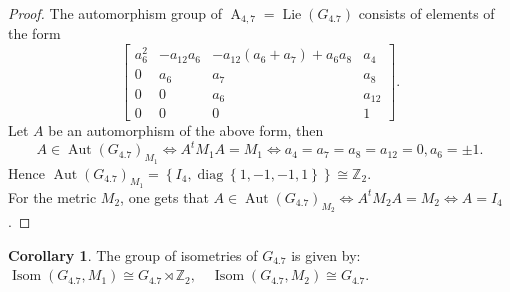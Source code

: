 \documentclass[12pt,a4paper,twoside]{article}
\theoremstyle{definition}
\newtheorem{corollary}[theorem]{Corollary}
\begin{document}
\begin{proof}
The automorphism group of $\operatorname{A}_{4, 7} = \operatorname{Lie}(G_{4.7})$ consists of elements of the form \cite{christodoulakis2003automorphisms}
$$\begin{bmatrix}
a_6^2 & -a_{12}a_6 & -a_{12}(a_6 + a_7) + a_6a_8 & a_4\\
0 & a_6 & a_7 & a_8\\
0 & 0 & a_6 & a_{12}\\
0 & 0 & 0 & 1
\end{bmatrix}.$$
Let $A$ be an automorphism of the above form, then
$$A \in \operatorname{Aut}\left(G_{4.7}\right)_{M_1} \Leftrightarrow A^tM_1A = M_1 \Leftrightarrow a_4 = a_7 = a_8 = a_{12} = 0, a_6 = \pm1.$$
Hence $\operatorname{Aut}\left(G_{4.7}\right)_{M_1} = \left\lbrace I_4, \operatorname{diag}\left\lbrace 1, -1, -1, 1\right\rbrace\right\rbrace \cong \mathbb{Z}_2$.\\
For the metric $M_2$, one gets that $A \in \operatorname{Aut}\left(G_{4.7}\right)_{M_2} \Leftrightarrow A^tM_2A = M_2 \Leftrightarrow A = I_4$.
\end{proof}
\begin{corollary}
The group of isometries of $G_{4.7}$ is given by:\\ $\operatorname{Isom}\left(G_{4.7}, M_1\right) \cong G_{4.7} \rtimes \mathbb{Z}_2, \quad \operatorname{Isom}\left(G_{4.7}, M_2\right) \cong G_{4.7}$.
\end{corollary}
\end{document}
